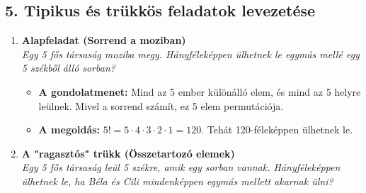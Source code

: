 \documentclass[11pt, a4paper]{article}
\begin{document}
\subsection*{5. Tipikus és trükkös feladatok levezetése}

\begin{enumerate}[label=\arabic*., leftmargin=*]
    \item \textbf{Alapfeladat (Sorrend a moziban)}\\
    \textit{Egy 5 fős társaság moziba megy. Hányféleképpen ülhetnek le egymás mellé egy 5 székből álló sorban?}
    \begin{itemize}
        \item \textbf{A gondolatmenet:} Mind az 5 ember különálló elem, és mind az 5 helyre leülnek. Mivel a sorrend számít, ez 5 elem permutációja.
        \item \textbf{A megoldás:} $5! = 5 \cdot 4 \cdot 3 \cdot 2 \cdot 1 = 120$. Tehát 120-féleképpen ülhetnek le.
    \end{itemize}

    \vspace{0.5cm}

    \item \textbf{A "ragasztós" trükk (Összetartozó elemek)}\\
    \textit{Egy 5 fős társaság leül 5 székre, amik egy sorban vannak. Hányféleképpen ülhetnek le, ha Béla és Cili mindenképpen egymás mellett akarnak ülni?}

    \begin{center}
\end{center}
\end{enumerate}
\end{document}

